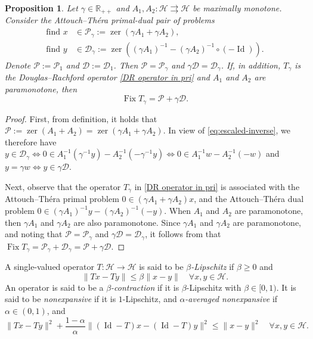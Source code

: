 \documentclass[a4paper,12pt]{article}
\newtheorem{proposition}[theorem]{Proposition}
\DeclareMathOperator{\Id}{Id}
\DeclareMathOperator{\Fix}{Fix}
\DeclareMathOperator{\zer}{zer}
\newcommand{\setto}{\rightrightarrows}
\begin{document}
\begin{proposition}\label{p:T_gamma-decomp}
    Let $\gamma \in \mathbb{R}_{++}$ and $A_1,A_2 \colon\mathcal{H}\setto\mathcal{H}$ be maximally monotone. Consider the Attouch--Th\'era primal-dual pair of problems
    \begin{equation*}
    \begin{aligned}
        \text{find~}x &\in \mathcal{P}_\gamma := \zer(\gamma A_1+ \gamma A_2), \\
        \text{find~}y &\in  \mathcal{D}_\gamma := \zer((\gamma A_1)^{-1}-(\gamma A_2)^{-1}\circ (-\Id)).
    \end{aligned}
    \end{equation*}
    Denote $\mathcal{P} := \mathcal{P}_1$ and $\mathcal{D} := \mathcal{D}_1$. Then $\mathcal{P} = \mathcal{P}_\gamma$ and $\gamma\mathcal{D} = \mathcal{D}_\gamma$. If, in addition,  $T_\gamma$ is the Douglas--Rachford operator \eqref{DR operator in pri} and $A_1$ and $A_2$ are paramonotone, then \begin{equation} \label{eq:para-duality}
    \Fix T_\gamma = \mathcal{P} + \gamma\mathcal{D}. %
\end{equation}
\end{proposition}
\begin{proof}
    First, from definition, it holds that $\mathcal{P}:=\zer(A_1+A_2) = \zer(\gamma A_1 + \gamma A_2)$. In view of \eqref{eq:escaled-inverse}, we therefore have $ y\in \mathcal{D}_\gamma\iff 0 \in A_1^{-1}(\gamma^{-1}y) - A_2^{-1}(-\gamma^{-1}y)\iff 0 \in A_1^{-1}w - A_2^{-1}(-w)$ and $y = \gamma w\iff y \in \gamma  \mathcal{D}$.
    
    
Next, observe that the operator $T_\gamma$ in \eqref{DR operator in pri} is associated with the Attouch--Th\'era primal problem $0 \in (\gamma A_1 + \gamma A_2)x$, and the Attouch--Th\'era dual problem $0 \in (\gamma A_1)^{-1}y - (\gamma A_2)^{-1}(-y)$. When $A_1$ and $A_2$ are paramonotone, then $\gamma A_1$ and $\gamma A_2$ are also paramonotone. Since $\gamma A_1$ and $\gamma A_2$ are paramonotone, and noting that $\mathcal{P}=\mathcal{P}_\gamma$ and $\gamma\mathcal{D}=\mathcal{D}_\gamma$, it follows from \cite[Corollary~5.5(iii)]{bauschke2012attouch} that $\Fix T_\gamma=\mathcal{P}_{\gamma}+\mathcal{D}_{\gamma}=\mathcal{P}+\gamma\mathcal{D}.$
\end{proof}


A single-valued operator $T:\mathcal{H}\rightarrow\mathcal{H}$ is said to be \emph{$\beta$-Lipschitz} if $\beta\geq0$ and $$\|Tx-Ty\|\leq\beta\|x-y\|\quad\forall x,y\in\mathcal{H}. $$
An operator is said to be a \emph{$\beta$-contraction} if it is $\beta$-Lipschitz with $\beta\in[0,1)$. It is said to be  \emph{nonexpansive} if it is $1$-Lipschitz, and  \emph{$\alpha$-averaged nonexpansive} if $\alpha\in(0,1)$, and
$$\|Tx-Ty\|^2+\frac{1-\alpha}{\alpha}\|(\Id-T)x-(\Id-T)y\|^2\leq\|x-y\|^2\quad\forall x,y\in\mathcal{H}.$$
\end{document}
